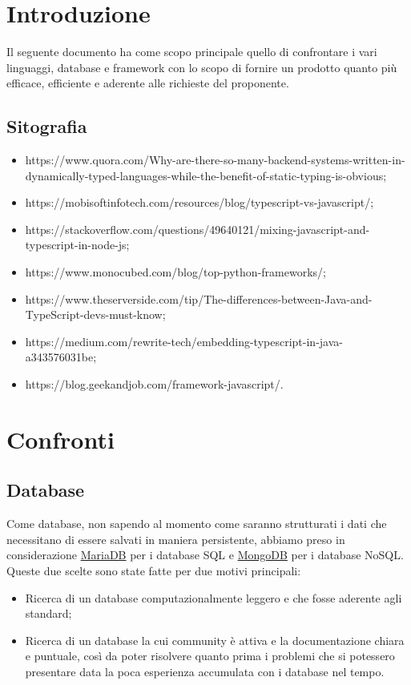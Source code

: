 \documentclass[a4paper, 12pt]{article}
\begin{document}
\makeindexdetails
\makefrontpage \makeversioni
\tableofcontents
\newpage
\clearpage
{}
\newpage
\section{Introduzione}
Il seguente documento ha come scopo principale quello di confrontare i vari linguaggi, database e framework con lo scopo di fornire un prodotto quanto più efficace, efficiente e aderente alle richieste del proponente.\\
\subsection{Sitografia}
\begin{itemize}
    \item https://www.quora.com/Why-are-there-so-many-backend-systems-written-in-dynamically-typed-languages-while-the-benefit-of-static-typing-is-obvious;
    \item https://mobisoftinfotech.com/resources/blog/typescript-vs-javascript/;
    \item https://stackoverflow.com/questions/49640121/mixing-javascript-and-typescript-in-node-js;
    \item https://www.monocubed.com/blog/top-python-frameworks/;
    \item https://www.theserverside.com/tip/The-differences-between-Java-and-TypeScript-devs-must-know;
    \item https://medium.com/rewrite-tech/embedding-typescript-in-java-a343576031be;
    \item https://blog.geekandjob.com/framework-javascript/.
\end{itemize}

\newpage
\section{Confronti}
\subsection{Database}
Come database, non sapendo al momento come saranno strutturati i dati che necessitano di essere salvati in maniera persistente, abbiamo preso in considerazione \href{https://mariadb.org/}{MariaDB} per i database SQL e \href{https://www.mongodb.com/}{MongoDB} per i database NoSQL. \\
Queste due scelte sono state fatte per due motivi principali:
\begin{itemize}
    \item Ricerca di un database computazionalmente leggero e che fosse aderente agli standard;
    \item Ricerca di un database la cui community è attiva e la documentazione chiara e puntuale, così da poter risolvere quanto prima i problemi che si potessero presentare data la poca esperienza accumulata con i database nel tempo.
\end{itemize}
\end{document}
